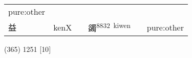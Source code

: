 \documentclass[14pt,a4paper]{scrartcl}
\begin{document}
\begin{longtable}[c]{@{}llllll@{}}
\begin{minipage}[t]{0.14\columnwidth}
pure:other
\strut\end{minipage}\tabularnewline
\begin{minipage}[t]{0.14\columnwidth}\raggedright\strut
益
\strut\end{minipage} &
\begin{minipage}[t]{0.14\columnwidth}\raggedright\strut
kenX
\strut\end{minipage} &
\begin{minipage}[t]{0.14\columnwidth}\raggedright\strut
\strut\end{minipage} &
\begin{minipage}[t]{0.14\columnwidth}\raggedright\strut
蠲\textsuperscript{8832~kiwen}
\strut\end{minipage} &
\begin{minipage}[t]{0.14\columnwidth}\raggedright\strut
\strut\end{minipage} &
\begin{minipage}[t]{0.14\columnwidth}\raggedright\strut
pure:other
\strut\end{minipage}\tabularnewline
\bottomrule
\end{longtable}

(365) 1251 {[}10{]}
\end{document}
